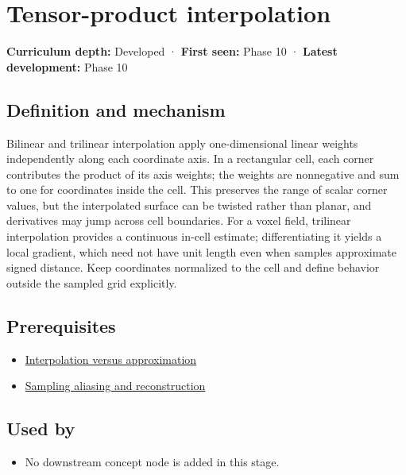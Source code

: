 \hypertarget{appendix-0a09b6dfdc86}{}\label{referencestart:appendix-0a09b6dfdc86}
\section{Tensor-product interpolation}\label{appendix-0a09b6dfdc86-tensor-product-interpolation}

\textbf{Curriculum depth:} Developed · \textbf{First seen:} Phase 10 · \textbf{Latest development:} Phase 10

\subsection{Definition and mechanism}\label{appendix-0a09b6dfdc86-definition-and-mechanism}

Bilinear and trilinear interpolation apply one-dimensional linear weights independently along each coordinate axis. In a rectangular cell, each corner contributes the product of its axis weights; the weights are nonnegative and sum to one for coordinates inside the cell. This preserves the range of scalar corner values, but the interpolated surface can be twisted rather than planar, and derivatives may jump across cell boundaries. For a voxel field, trilinear interpolation provides a continuous in-cell estimate; differentiating it yields a local gradient, which need not have unit length even when samples approximate signed distance. Keep coordinates normalized to the cell and define behavior outside the sampled grid explicitly.

\subsection{Prerequisites}\label{appendix-0a09b6dfdc86-prerequisites}

\begin{itemize}
\tightlist
\item
  \hyperref[appendix-0c2a5f69851e]{Interpolation versus approximation}
\item
  \hyperref[appendix-6a7869dd79a6]{Sampling aliasing and reconstruction}
\end{itemize}

\subsection{Used by}\label{appendix-0a09b6dfdc86-used-by}

\begin{itemize}
\tightlist
\item
  No downstream concept node is added in this stage.
\end{itemize}

